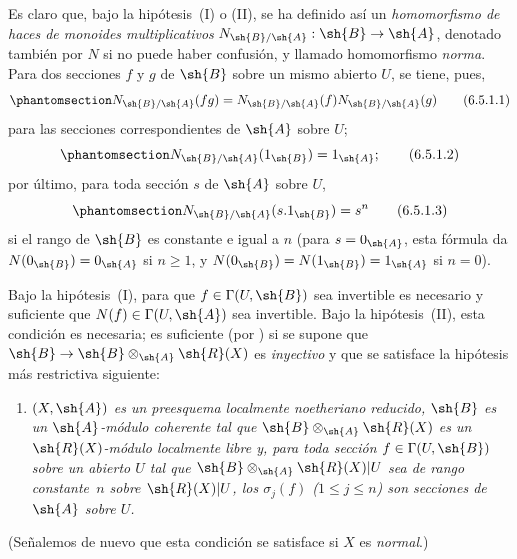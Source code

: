 \documentclass[oneside,10pt]{amsart}
\makeatletter
\renewcommand{\leq}{\leqslant}
\renewcommand{\geq}{\geqslant}
\newcommand{\ega@arrow}[2]{\mathchoice{#1}{#2}{#2}{#2}}
\renewcommand{\to}{\ega@arrow{\longrightarrow}{\rightarrow}}
\let\EGAOriginalLabel\label
\renewcommand{\label}[1]{\phantomsection\EGAOriginalLabel{#1}}
\makeatother
\begin{document}
\begin{env}[6.5.1]
Es claro que, bajo la hipótesis~(I) o (II), se ha definido así un \emph{homomorfismo de haces de monoides multiplicativos} $N_{\sh{B}/\sh{A}}:\sh{B}\to\sh{A}$, denotado también por $N$ si no puede haber confusión, y llamado homomorfismo \emph{norma}.
Para dos secciones $f$ y $g$ de $\sh{B}$ sobre un mismo abierto $U$, se tiene, pues,
\[
\label{II.6.5.1.1}
  N_{\sh{B}/\sh{A}}(fg) = N_{\sh{B}/\sh{A}}(f)N_{\sh{B}/\sh{A}}(g)
\tag{6.5.1.1}
\]
para las secciones correspondientes de $\sh{A}$ sobre $U$;
\[
\label{II.6.5.1.2}
  N_{\sh{B}/\sh{A}}(1_{\sh{B}}) = 1_{\sh{A}};
\tag{6.5.1.2}
\]
por último, para toda sección $s$ de $\sh{A}$ sobre $U$,
\[
\label{II.6.5.1.3}
  N_{\sh{B}/\sh{A}}(s.1_{\sh{B}}) = s^n
\tag{6.5.1.3}
\]
si el rango de $\sh{B}$ es constante e igual a $n$ (para $s=0_{\sh{A}}$, esta fórmula da $N(0_{\sh{B}})=0_{\sh{A}}$ si $n\geq1$, y $N(0_{\sh{B}})=N(1_{\sh{B}})=1_{\sh{A}}$ si $n=0$).

Bajo la hipótesis~(I), para que $f\in\Gamma(U,\sh{B})$ sea invertible es necesario y suficiente que $N(f)\in\Gamma(U,\sh{A})$ sea invertible.
Bajo la hipótesis~(II), esta condición es necesaria;
es suficiente (por ) si se supone que $\sh{B}\to\sh{B}\otimes_{\sh{A}}\sh{R}(X)$ es \emph{inyectivo} y que se satisface la hipótesis más restrictiva siguiente:
\begin{enumerate}
  \item[{\rm(II~\emph{bis})}] \emph{$(X,\sh{A})$ es un preesquema localmente noetheriano reducido, $\sh{B}$ es un $\sh{A}$-módulo coherente tal que $\sh{B}\otimes_{\sh{A}}\sh{R}(X)$ es un $\sh{R}(X)$-módulo localmente libre y, para toda sección $f\in\Gamma(U,\sh{B})$ sobre un abierto $U$ tal que $\sh{B}\otimes_{\sh{A}}\sh{R}(X)|U$ sea de rango constante~$n$ sobre $\sh{R}(X)|U$, los $\sigma_j(f)$ ($1\leq j\leq n$) son secciones de $\sh{A}$ sobre $U$.}
\end{enumerate}

(Señalemos de nuevo que esta condición se satisface si $X$ es \emph{normal}.)
\end{env}
\end{document}
